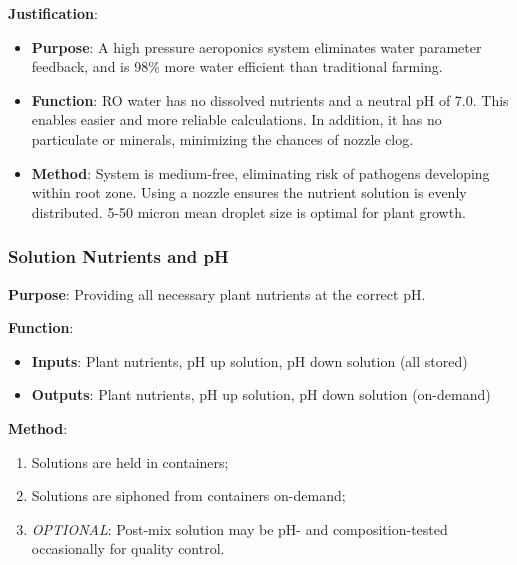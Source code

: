 \documentclass{report}
\begin{document}
\newpage

\textbf{Justification}: 
\begin{itemize}
    \item \textbf{Purpose}: A high pressure aeroponics system eliminates water parameter feedback, and is 98\% more water efficient than traditional farming.
    \item \textbf{Function}: RO water has no dissolved nutrients and a neutral pH of 7.0. This enables easier and more reliable calculations. In addition, it has no particulate or minerals, minimizing the chances of nozzle clog.
    \item \textbf{Method}: System is medium-free, eliminating risk of pathogens developing within root zone. Using a nozzle ensures the nutrient solution is evenly distributed. 5-50 micron mean droplet size is optimal for plant growth. %
\end{itemize}

\subsubsection{Solution Nutrients and pH}
\label{sec:nutrientsph}

\textbf{Purpose}: Providing all necessary plant nutrients at the correct pH.

\textbf{Function}:
\begin{itemize}
    \item \textbf{Inputs}: Plant nutrients, pH up solution, pH down solution (all stored)
    \item \textbf{Outputs}: Plant nutrients, pH up solution, pH down solution (on-demand)
\end{itemize}

\textbf{Method}:
\begin{enumerate}
    \item Solutions are held in containers;
    \item Solutions are siphoned from containers on-demand;
    \item \textit{OPTIONAL}: Post-mix solution may be pH- and composition-tested occasionally for quality control.
\end{enumerate}
\end{document}
